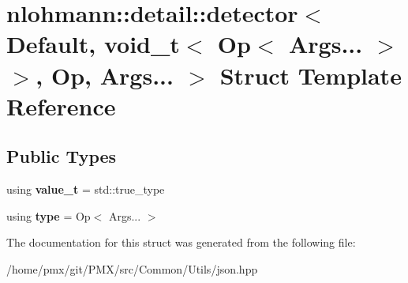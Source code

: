 \hypertarget{structnlohmann_1_1detail_1_1detector_3_01Default_00_01void__t_3_01Op_3_01Args_8_8_8_01_4_01_4_00_01Op_00_01Args_8_8_8_01_4}{}\section{nlohmann\+:\+:detail\+:\+:detector$<$ Default, void\+\_\+t$<$ Op$<$ Args... $>$ $>$, Op, Args... $>$ Struct Template Reference}
\label{structnlohmann_1_1detail_1_1detector_3_01Default_00_01void__t_3_01Op_3_01Args_8_8_8_01_4_01_4_00_01Op_00_01Args_8_8_8_01_4}
\subsection*{Public Types}
\begin{DoxyCompactItemize}
\item 
\mbox{\label{structnlohmann_1_1detail_1_1detector_3_01Default_00_01void__t_3_01Op_3_01Args_8_8_8_01_4_01_4_00_01Op_00_01Args_8_8_8_01_4_ab748f9f00bb31bee4978a033589f8c85}} 
using {\bfseries value\+\_\+t} = std\+::true\+\_\+type
\item 
\mbox{\label{structnlohmann_1_1detail_1_1detector_3_01Default_00_01void__t_3_01Op_3_01Args_8_8_8_01_4_01_4_00_01Op_00_01Args_8_8_8_01_4_a5afd6a40e94dde21d120ac646468c495}} 
using {\bfseries type} = Op$<$ Args... $>$
\end{DoxyCompactItemize}


The documentation for this struct was generated from the following file\+:\begin{DoxyCompactItemize}
\item 
/home/pmx/git/\+P\+M\+X/src/\+Common/\+Utils/json.\+hpp\end{DoxyCompactItemize}
